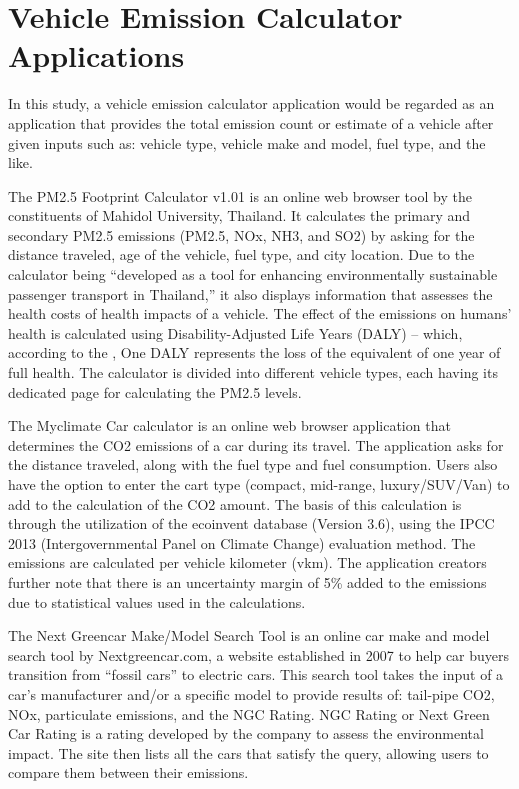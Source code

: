 \section{Vehicle Emission Calculator Applications}
	In this study, a vehicle emission calculator application would be regarded as an application that provides the total emission count or estimate of a vehicle after given inputs such as: vehicle type, vehicle make and model, fuel type, and the like.
	
	The PM2.5 Footprint Calculator v1.01 is an online web browser tool by the constituents of Mahidol University, Thailand. It calculates the primary and secondary PM2.5 emissions (PM2.5, NOx, NH3, and SO2) by asking for the distance traveled, age of the vehicle, fuel type, and city location. Due to the calculator being “developed as a tool for enhancing environmentally sustainable passenger transport in Thailand,” it also displays information that assesses the health costs of health impacts of a vehicle. The effect of the emissions on humans’ health is calculated using  Disability-Adjusted Life Years (DALY) – which, according to the \cite{WHO_nd}, One DALY represents the loss of the equivalent of one year of full health. The calculator is divided into different vehicle types, each having its dedicated page for calculating the PM2.5 levels. \cite{pm25_footprint}
	
	

	The Myclimate Car calculator is an online web browser application that determines the CO2 emissions of a car during its travel. The application asks for the distance traveled, along with the fuel type and fuel consumption. Users also have the option to enter the cart type (compact, mid-range, luxury/SUV/Van) to add to the calculation of the CO2 amount.  The basis of this calculation is through the utilization of the ecoinvent database (Version 3.6), using the IPCC 2013  (Intergovernmental Panel on Climate Change) evaluation method. The emissions are calculated per vehicle kilometer (vkm). The application creators further note that there is an uncertainty margin of 5\% added to the emissions due to statistical values used in the calculations. \cite{MCF_ND}

	The Next Greencar Make/Model Search Tool is an online car make and model search tool by Nextgreencar.com, a website established in 2007 to help car buyers transition from “fossil cars” to electric cars. This search tool takes the input of a car’s manufacturer and/or a specific model to provide results of: tail-pipe CO2, NOx, particulate emissions, and the NGC Rating. NGC Rating or Next Green Car Rating is a rating developed by the company to assess the environmental impact. \cite{Lilly_ND}  The site then lists all the cars that satisfy the query, allowing users to compare them between their emissions. 

